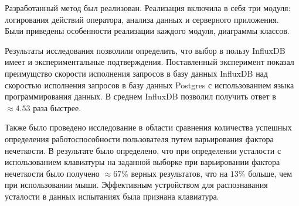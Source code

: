 Разработанный метод был реализован. Реализация включила в себя три модуля: логирования действий оператора, анализа данных и серверного приложения. Были приведены особенности реализации каждого модуля, диаграммы классов.

Результаты исследования позволили определить, что выбор в пользу \newline InfluxDB имеет и экспериментальные подтверждения. Поставленный эксперимент показал преимущство скорости исполнения запросов в базу данных \newline InfluxDB над скоростью исполнения запросов в базу данных Postgres с использованием языка программирования данных. В среднем InfluxDB позволил получить ответ в $\approx 4.53$ раза быстрее.

Также было проведено исследование в области сравнения количества ус\-пешных определения работоспособности пользователя путем варьирования \newline фактора нечеткости. В результате было определено, что при определении усталости с использованием клавиатуры на заданной выборке при варьировании фактора нечеткости было получено $\approx 67\%$ верных результатов, что на $13\%$ больше, чем при использовании мыши. Эффективным устройством для распознавания усталости в данных испытаниях была признана клавиатура.

\pagebreak